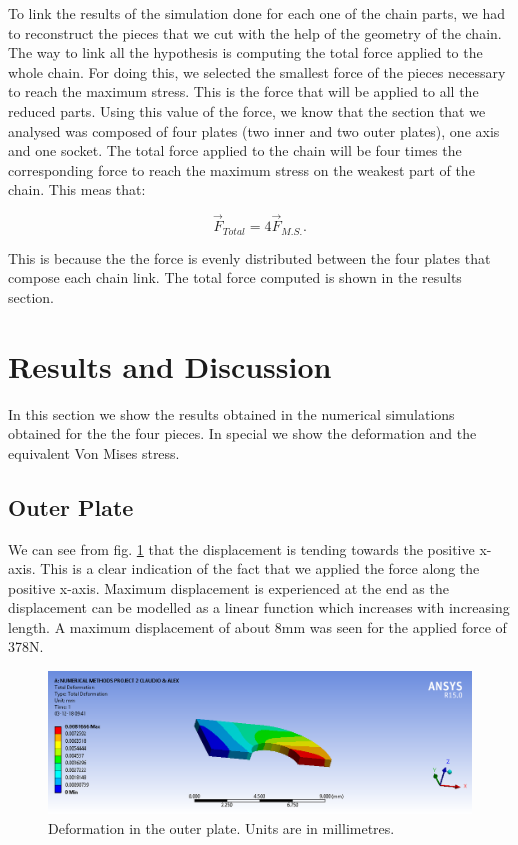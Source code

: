 \documentclass[a4paper 12pt]{article}
\begin{document}
To link the results of the simulation done for each one of the chain parts, we had to reconstruct the pieces that we cut with the help of the geometry of the chain. The way to link all the hypothesis is computing the total force applied to the whole chain. For doing this, we selected the smallest force of the pieces necessary to reach the maximum stress. This is the force that will be applied to all the reduced parts. Using this value of the force, we know that the section that we analysed was composed of four plates (two inner and two outer plates), one axis and one socket. The total force applied to the chain will be four times the corresponding force to reach the maximum stress on the weakest part of the chain. This meas that:

\begin{equation}
    \vec{F}_{Total} = 4 \vec{F}_{M.S.}.
\end{equation}

This is because the the force is evenly distributed between the four plates that compose each chain link. The total force computed is shown in the results section. 

\section{Results and Discussion}

In this section we show the results obtained in the numerical simulations obtained for the the four pieces. In special we show the deformation and the equivalent Von Mises stress.

\subsection{Outer Plate}
We can see from fig. \ref{fig:outer_deformation} that the displacement is tending towards the positive x-axis. This is a clear indication of the fact that we applied the force along the positive x-axis. Maximum displacement is experienced at the end as the displacement can be modelled as a linear function which increases with increasing length. A maximum displacement of about 8mm was seen for the applied force of 378N.   



\begin{figure}[!ht]
    \centering
    \includegraphics[width=1\textwidth]{images/OUTER_CHAIN_DEFORMATION.png}
    \caption{Deformation in the outer plate. Units are in millimetres.}
    \label{fig:outer_deformation}
\end{figure}
\end{document}
